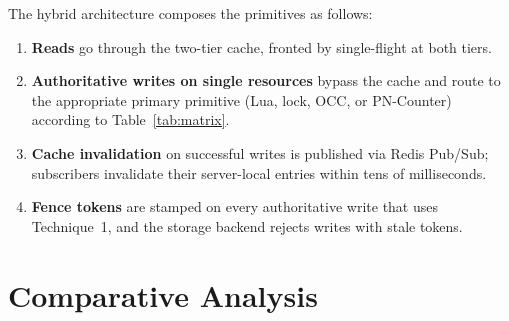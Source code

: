 \documentclass[12pt,a4paper,oneside]{report}
\begin{document}
\noindent The hybrid architecture composes the primitives as follows:
\begin{enumerate}[leftmargin=*]
    \item \textbf{Reads} go through the two-tier cache, fronted by single-flight at both tiers.
    \item \textbf{Authoritative writes on single resources} bypass the cache and route to the appropriate primary primitive (Lua, lock, OCC, or PN-Counter) according to Table~\ref{tab:matrix}.
    \item \textbf{Cache invalidation} on successful writes is published via Redis Pub/Sub; subscribers invalidate their server-local entries within tens of milliseconds.
    \item \textbf{Fence tokens} are stamped on every authoritative write that uses Technique~1, and the storage backend rejects writes with stale tokens.
\end{enumerate}

\section{Comparative Analysis}

\begin{table}[h]
\centering
\footnotesize
\setlength{\tabcolsep}{4pt}
\renewcommand{\arraystretch}{1.2}
\caption{Comparative properties of the five contention primitives.}
\label{tab:compare}
\end{table}
\end{document}
